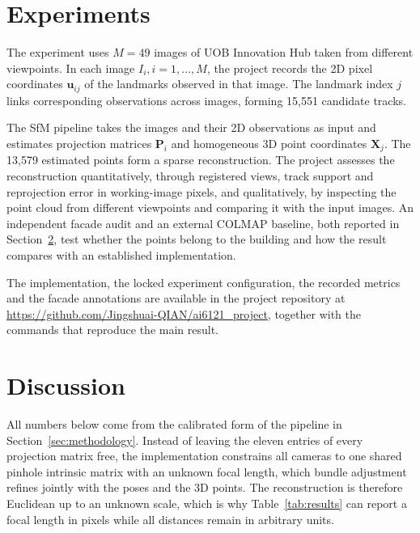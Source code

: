 \documentclass[11pt,a4paper]{article}
\begin{document}
\section{Experiments}
\label{sec:experiments}

The experiment uses \(M = 49\) images of UOB Innovation Hub taken from different viewpoints. In each image \(I_i, i = 1, \dots, M\), the project records the 2D pixel coordinates \(\mathbf u_{ij}\) of the landmarks observed in that image. The landmark index \(j\) links corresponding observations across images, forming 15,551 candidate tracks.

The SfM pipeline takes the images and their 2D observations as input and estimates projection matrices \(\mathbf P_i\) and homogeneous 3D point coordinates \(\mathbf X_j\). The 13,579 estimated points form a sparse reconstruction. The project assesses the reconstruction quantitatively, through registered views, track support and reprojection error in working-image pixels, and qualitatively, by inspecting the point cloud from different viewpoints and comparing it with the input images. An independent facade audit and an external COLMAP baseline, both reported in Section~\ref{sec:discussion}, test whether the points belong to the building and how the result compares with an established implementation.

The implementation, the locked experiment configuration, the recorded metrics and the facade annotations are available in the project repository at \url{https://github.com/Jingshuai-QIAN/ai6121_project}, together with the commands that reproduce the main result.

\section{Discussion}
\label{sec:discussion}

All numbers below come from the calibrated form of the pipeline in Section~\ref{sec:methodology}. Instead of leaving the eleven entries of every projection matrix free, the implementation constrains all cameras to one shared pinhole intrinsic matrix with an unknown focal length, which bundle adjustment refines jointly with the poses and the 3D points. The reconstruction is therefore Euclidean up to an unknown scale, which is why Table~\ref{tab:results} can report a focal length in pixels while all distances remain in arbitrary units.
\end{document}
